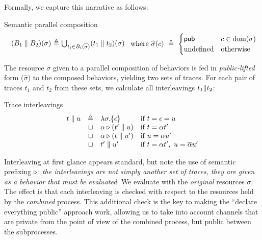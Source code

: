 \documentclass{entcs}
\begin{document}
Formally, we capture this narrative as follows: 
\begin{display}
{Semantic parallel composition}
\[
\begin{array}{r@{\ \eqdef\ }l}
(B_1 \parallel B_2)(\sigma) &
  \bigcup_{t_i \in B_i(\widehat{\sigma})} (t_1 \tparallel t_2)(\sigma) 
\end{array}
\ \textrm{where}\ 
\widehat{\sigma}(c)\ \eqdef\
\begin{cases}
  \pub & c \in \dom(\sigma) \\
  \textrm{undefined} & \textrm{otherwise}
\end{cases}
\]
\end{display}
The resource $\sigma$ given to a parallel composition of behaviors is
fed in \emph{public-lifted} form ($\widehat{\sigma}$) to the composed
behaviors, yielding two sets of traces.  For each pair of traces $t_1$
and $t_2$ from these sets, we calculate all interleavings
$t_1 \mbox{$\parallel$} t_2$:
\begin{display}
{Trace interleavings}
\[
\begin{array}{rcll}
t \parallel u &\triangleq& 
  \lambda \sigma.\{\epsilon\}    &\textrm{if } t = \epsilon = u \\&\sqcup&
  \alpha \triangleright (t' \parallel u) &\textrm{if } t = \alpha t' \\&\sqcup&
  \alpha \triangleright (t \parallel u') &\textrm{if } u = \alpha u' \\&\sqcup&
  t' \parallel u' &\textrm{if } t = \alpha t',\ u = \overline{\alpha} u'
\end{array}
\]
\end{display}
Interleaving at first glance appears standard, but note the use of
semantic prefixing $\triangleright$: \emph{the interleavings are not simply
  another set of traces, they are given as a \emph{behavior} that must
  be evaluated}.  We evaluate with the \emph{original} resources
$\sigma$.  The effect is that each interleaving is checked with
respect to the resources held by the \emph{combined} process.  This
additional check is the key to making the ``declare everything
public'' approach work, allowing us to take into account channels that
are private from the point of view of the combined process, but public
between the subprocesses.
\end{document}
